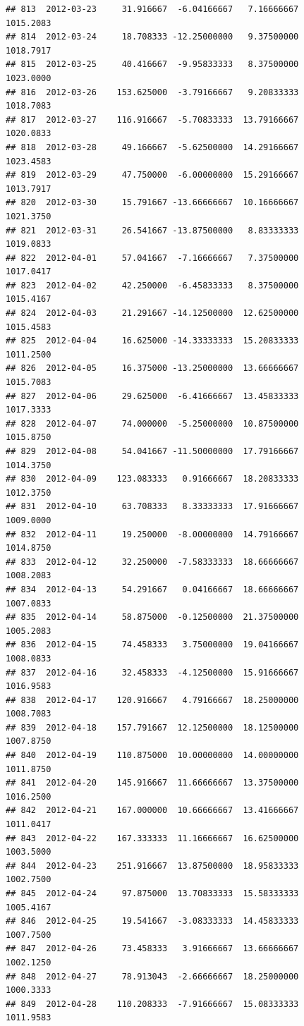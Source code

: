 \documentclass[
]{article}
\begin{document}
\begin{verbatim}
## 813  2012-03-23     31.916667  -6.04166667   7.16666667    1015.2083
## 814  2012-03-24     18.708333 -12.25000000   9.37500000    1018.7917
## 815  2012-03-25     40.416667  -9.95833333   8.37500000    1023.0000
## 816  2012-03-26    153.625000  -3.79166667   9.20833333    1018.7083
## 817  2012-03-27    116.916667  -5.70833333  13.79166667    1020.0833
## 818  2012-03-28     49.166667  -5.62500000  14.29166667    1023.4583
## 819  2012-03-29     47.750000  -6.00000000  15.29166667    1013.7917
## 820  2012-03-30     15.791667 -13.66666667  10.16666667    1021.3750
## 821  2012-03-31     26.541667 -13.87500000   8.83333333    1019.0833
## 822  2012-04-01     57.041667  -7.16666667   7.37500000    1017.0417
## 823  2012-04-02     42.250000  -6.45833333   8.37500000    1015.4167
## 824  2012-04-03     21.291667 -14.12500000  12.62500000    1015.4583
## 825  2012-04-04     16.625000 -14.33333333  15.20833333    1011.2500
## 826  2012-04-05     16.375000 -13.25000000  13.66666667    1015.7083
## 827  2012-04-06     29.625000  -6.41666667  13.45833333    1017.3333
## 828  2012-04-07     74.000000  -5.25000000  10.87500000    1015.8750
## 829  2012-04-08     54.041667 -11.50000000  17.79166667    1014.3750
## 830  2012-04-09    123.083333   0.91666667  18.20833333    1012.3750
## 831  2012-04-10     63.708333   8.33333333  17.91666667    1009.0000
## 832  2012-04-11     19.250000  -8.00000000  14.79166667    1014.8750
## 833  2012-04-12     32.250000  -7.58333333  18.66666667    1008.2083
## 834  2012-04-13     54.291667   0.04166667  18.66666667    1007.0833
## 835  2012-04-14     58.875000  -0.12500000  21.37500000    1005.2083
## 836  2012-04-15     74.458333   3.75000000  19.04166667    1008.0833
## 837  2012-04-16     32.458333  -4.12500000  15.91666667    1016.9583
## 838  2012-04-17    120.916667   4.79166667  18.25000000    1008.7083
## 839  2012-04-18    157.791667  12.12500000  18.12500000    1007.8750
## 840  2012-04-19    110.875000  10.00000000  14.00000000    1011.8750
## 841  2012-04-20    145.916667  11.66666667  13.37500000    1016.2500
## 842  2012-04-21    167.000000  10.66666667  13.41666667    1011.0417
## 843  2012-04-22    167.333333  11.16666667  16.62500000    1003.5000
## 844  2012-04-23    251.916667  13.87500000  18.95833333    1002.7500
## 845  2012-04-24     97.875000  13.70833333  15.58333333    1005.4167
## 846  2012-04-25     19.541667  -3.08333333  14.45833333    1007.7500
## 847  2012-04-26     73.458333   3.91666667  13.66666667    1002.1250
## 848  2012-04-27     78.913043  -2.66666667  18.25000000    1000.3333
## 849  2012-04-28    110.208333  -7.91666667  15.08333333    1011.9583

\end{verbatim}
\end{document}

